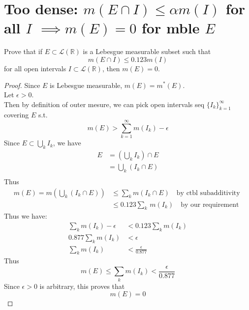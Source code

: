 \documentclass[lang=cn,11pt]{elegantbook}
\begin{document}
\section{Too dense: $m(E\cap I)\le \alpha m(I) $ for all $I$ $\implies m(E)=0$ for mble $E$}
  Prove that if $E\subset \mathcal{L}(\mathbb{R})$ is a Lebesgue measurable subset such that  \[
    m(E\cap I)\le 0.123m(I) 
  \]
  for all open intervals $I\subset  \mathcal{L}(\mathbb{R})$, then $m(E)=0$. 
\begin{proof}
    Since $E$ is Lebesgue measurable, $m(E) = m^*(E)$.\\
    Let $\epsilon > 0$.\\
    Then by definition of outer mesure, we can pick open intervals seq $\{I_k\}_{k=1}^\infty$ covering $E$ s.t. \[
   m(E) >  \sum_{k=1}^\infty m(I_k )    -\epsilon
    \] Since $E \subset \bigcup_k I_k$, we have  \begin{align}
        E & = (\bigcup_k I_k)  \cap E \\
        & = \bigcup_k (I_k \cap E)\\
    \end{align}
    Thus \begin{align}
        m(E) = m(\bigcup_k (I_k \cap E)) &\leq \sum_k m(I_k \cap E)\quad\text{by ctbl subadditivity }\\
        &\leq 0.123 \sum_k \,m(I_k)  \quad \text{by our requirement}
    \end{align}
    Thus we have: 
    \begin{align}
            \sum_k  m(I_k )    -\epsilon &<  0.123 \sum_k m(I_k)\\
            0.877 \sum_k m(I_k) &< \epsilon\\
            \sum_k m(I_k) &< \frac{\epsilon}{0.877}
    \end{align}
  Thus   \[
  m(E) \leq   \sum_k  m(I_k )   <  \frac{\epsilon}{0.877}
    \]
    Since $\epsilon > 0$ is arbitrary, this proves that \[
    m(E)  = 0
    \]
\end{proof}
\end{document}
